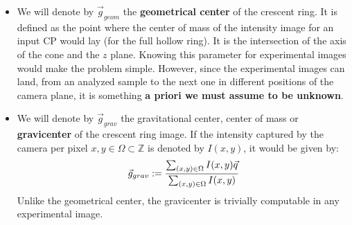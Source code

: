 \documentclass[11pt, a4paper, twoside]{article} %
\begin{document}
\begin{itemize}
\item We will denote by $\vec{g}_{geom}$ the {\bf geometrical center} of the crescent ring. It is defined as the point where the center of mass of the intensity image for an input CP would lay (for the full hollow ring). It is the intersection of the axis of the cone and the $z$ plane. Knowing this parameter for experimental images would make the problem simple. However, since the experimental images can land, from an analyzed sample to the next one in different positions of the camera plane, it is something {\bf a priori we must assume to be unknown}.

\item We will denote by $\vec{g}_{grav}$ the gravitational center, center of mass or {\bf gravicenter} of the crescent ring image. If the intensity captured by the camera per pixel $x,y\in\Omega\subset\mathbb{Z}$ is denoted by $I(x,y)$, it would be given by:\vspace{-0.1cm}
\begin{equation}\label{grav}
\vec{g}_{grav}:=\frac{\sum_{(x,y)\in\Omega} I(x,y)\vec{q}}{\sum_{(x,y)\in\Omega}I(x,y)}\vspace{0.1cm}
\end{equation}
Unlike the geometrical center, the gravicenter is trivially computable in any experimental image.
\end{itemize}
\end{document}
